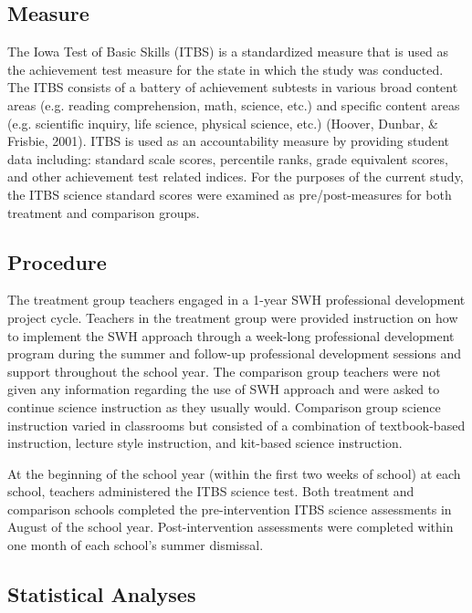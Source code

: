 \documentclass[11.5pt]{sig-alternate} %
\begin{document}
\begin{large}
\subsection*{Measure}

The Iowa Test of Basic Skills (ITBS) is a standardized measure that is used as the achievement test measure for the state in which the study was conducted.  The ITBS consists of a battery of achievement subtests in various broad content areas (e.g. reading comprehension, math, science, etc.) and specific content areas (e.g. scientific inquiry, life science, physical science, etc.) (Hoover, Dunbar, \& Frisbie, 2001).  ITBS is used as an accountability measure by providing student data including:  standard scale scores, percentile ranks, grade equivalent scores, and other achievement test related indices.  For the purposes of the current study, the ITBS science standard scores were examined as pre/post-measures for both treatment and comparison groups.

\subsection*{Procedure}

The treatment group teachers engaged in a 1-year SWH professional development project cycle. Teachers in the treatment group were provided instruction on how to implement the SWH approach through a week-long professional development program during the summer and follow-up professional development sessions and support throughout the school year.  The comparison group teachers were not given any information regarding the use of SWH approach and were asked to continue science instruction as they usually would.   Comparison group science instruction varied in classrooms but consisted of a combination of textbook-based instruction, lecture style instruction, and kit-based science instruction.  

At the beginning of the school year (within the first two weeks of school) at each school, teachers administered the ITBS science test.  Both treatment and comparison schools completed the pre-intervention ITBS science assessments in August of the school year.  Post-intervention assessments were completed within one month of each school’s summer dismissal.  

\subsection*{Statistical Analyses}


\end{large}
\end{document}
